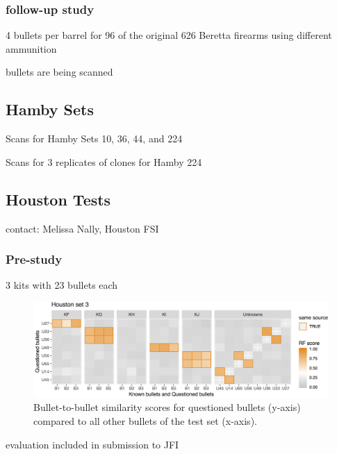 \documentclass[]{book}
\begin{document}
\hypertarget{follow-up-study}{%
\subsubsection{follow-up study}\label{follow-up-study}}

4 bullets per barrel for 96 of the original 626 Beretta firearms using different ammunition

bullets are being scanned

\hypertarget{hamby-sets}{%
\subsection{Hamby Sets}\label{hamby-sets}}

Scans for Hamby Sets 10, 36, 44, and 224

Scans for 3 replicates of clones for Hamby 224

\hypertarget{houston-tests}{%
\subsection{Houston Tests}\label{houston-tests}}

contact: Melissa Nally, Houston FSI

\hypertarget{pre-study}{%
\subsubsection{Pre-study}\label{pre-study}}

3 kits with 23 bullets each

\begin{figure}

{\centering \includegraphics[width=58.11in]{images/bullets/houston-pre-set3} 

}

\caption{Bullet-to-bullet similarity scores for questioned bullets (y-axis) compared to all other bullets of the test set (x-axis).}\label{fig:unnamed-chunk-5}
\end{figure}

evaluation included in submission to JFI
\end{document}
